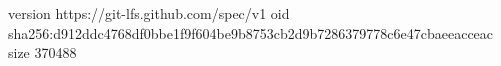 version https://git-lfs.github.com/spec/v1
oid sha256:d912ddc4768df0bbe1f9f604be9b8753cb2d9b7286379778c6e47cbaeeacceac
size 370488
